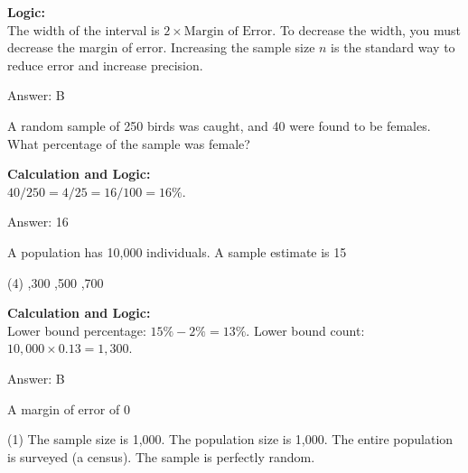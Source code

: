 \documentclass[11pt,paper=a4,answers]{exam}
\begin{document}
\begin{questions}
\begin{solution}
\textbf{Logic:} \\
The width of the interval is $2 \times \text{Margin of Error}$. To decrease the width, you must decrease the margin of error. Increasing the sample size $n$ is the standard way to reduce error and increase precision.

\vspace{30pt}

Answer: \colorbox{yellow!100}{B}
\end{solution}

\vspace{60pt}

\question
A random sample of 250 birds was caught, and 40 were found to be females. What percentage of the sample was female?

\begin{solution}
\textbf{Calculation and Logic:} \\
$40 / 250 = 4 / 25 = 16 / 100 = 16\%$.

\vspace{30pt}

Answer: \colorbox{yellow!100}{16}
\end{solution}

\vspace{60pt}

\question
A population has 10,000 individuals. A sample estimate is 15%
\begin{tasks}(4)
    ,300
    ,500
    ,700
\end{tasks}

\begin{solution}
\textbf{Calculation and Logic:} \\
Lower bound percentage: $15\% - 2\% = 13\%$. Lower bound count: $10,000 \times 0.13 = 1,300$.

\vspace{30pt}

Answer: \colorbox{yellow!100}{B}
\end{solution}

\vspace{60pt}

\question
A margin of error of 0%
\begin{tasks}(1)
    \task The sample size is 1,000.
    \task The population size is 1,000.
    \task The entire population is surveyed (a census).
    \task The sample is perfectly random.
\end{tasks}


\end{questions}
\end{document}
